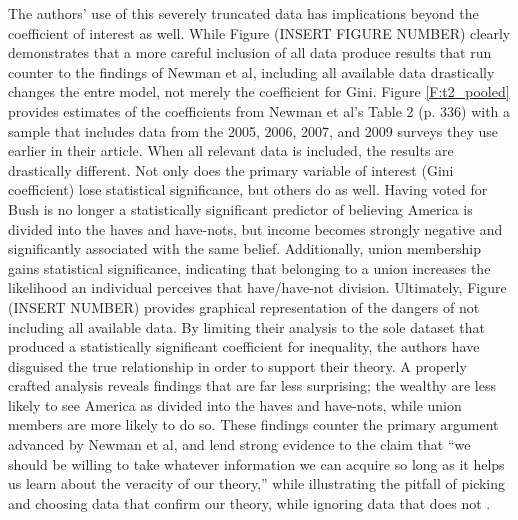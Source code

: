 The authors’ use of this severely truncated data has implications beyond the coefficient of interest as well. While Figure (INSERT FIGURE NUMBER) clearly demonstrates that a more careful inclusion of all data produce results that run counter to the findings of Newman et al, including all available data drastically changes the entre model, not merely the coefficient for Gini. Figure \ref{F:t2_pooled} provides estimates of the coefficients from Newman et al’s Table 2 (p. 336) with a sample that includes data from the 2005, 2006, 2007, and 2009 surveys they use earlier in their article. When all relevant data is included, the results are drastically different. Not only does the primary variable of interest (Gini coefficient) lose statistical significance, but others do as well. Having voted for Bush is no longer a statistically significant predictor of believing America is divided into the haves and have-nots, but income becomes strongly negative and significantly associated with the same belief. Additionally, union membership gains statistical significance, indicating that belonging to a union increases the likelihood an individual perceives that have/have-not division. Ultimately, Figure (INSERT NUMBER) provides graphical representation of the dangers of not including all available data. By limiting their analysis to the sole dataset that produced a statistically significant coefficient for inequality, the authors have disguised the true relationship in order to support their theory. A properly crafted analysis reveals findings that are far less surprising; the wealthy are less likely to see America as divided into the haves and have-nots, while union members are more likely to do so. These findings counter the primary argument advanced by Newman et al, and lend strong evidence to the claim that ``we should be willing to take whatever information we can acquire so long as it helps us learn about the veracity of our theory,'' while illustrating the pitfall of picking and choosing data that confirm our theory, while ignoring data that does not \citep[31]{King1994}.


